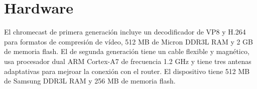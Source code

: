 \section{Hardware}

El chromecast de primera generación incluye un decodificador de VP8 y H.264 para formatos de compresión de vídeo, 512 MB de Micron DDR3L RAM y 2 GB de memoria flash.
El de segunda generación tiene un cable flexible y magnético, usa procesador dual ARM Cortex-A7 de frecuencia 1.2 GHz y tiene tres antenas adaptativas para mejroar la conexión con el router.
El dispositivo tiene 512 MB de Samsung DDR3L RAM y 256 MB de memoria flash.
